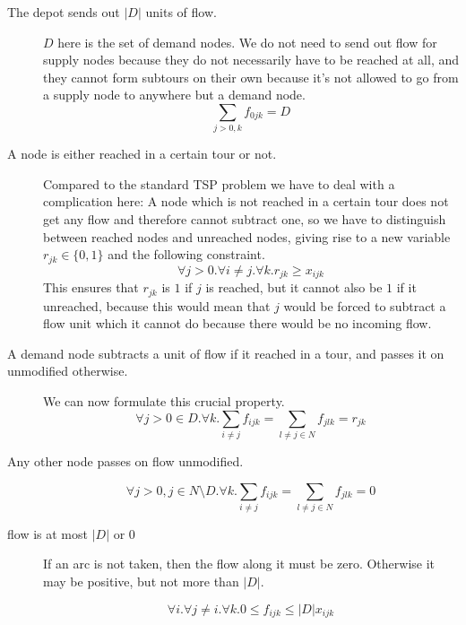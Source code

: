 \begin{description}
  \item[The depot sends out $|D|$ units of flow.] $D$ here is the set of demand nodes. We do 
  not need to send out flow for supply nodes because they do not necessarily have to be
  reached at all, and they cannot form subtours on their own because it's not allowed to 
  go from a supply node to anywhere but a demand node.
     \begin{equation}
       \sum_{j>0,k} f_{0jk} = D
     \end{equation}

  \item[A node is either reached in a certain tour or not.]
     Compared to the standard TSP problem we have to deal with a complication here: A node which 
     is not reached in a certain tour does not get any flow and therefore cannot subtract one,
     so we have to distinguish between reached nodes and unreached nodes, giving rise to a new
     variable $r_{jk} \in \{0,1\}$ and the following constraint.
     \begin{equation}
        \forall j>0. \forall i \neq j. \forall k. r_{jk} \geq x_{ijk}
     \end{equation}
     This ensures that $r_{jk}$ is $1$ if $j$ is reached, but it cannot also be $1$ if it unreached,
     because this would mean that $j$ would be forced to subtract a flow unit which it cannot
     do because there would be no incoming flow.

  \item[A demand node subtracts a unit of flow if it reached in a tour, and passes it on unmodified
        otherwise.] We can now formulate this crucial property.
  \begin{equation}
        \forall j>0 \in D. \forall k. \sum_{i \neq j} f_{ijk} = \sum_{l \neq j \in N} f_{jlk} = r_{jk}
  \end{equation}

  \item[Any other node passes on flow unmodified.]
  \begin{equation}
        \forall j>0, j \in N \setminus D. \forall k. \sum_{i \neq j} f_{ijk} = \sum_{l \neq j \in N} f_{jlk} = 0
  \end{equation}

  \item[flow is at most $|D|$ or $0$] 

  If an arc is not taken, then the flow along it must be zero. Otherwise it may be positive, but 
  not more than $|D|$.

  \begin{equation}
        \forall i. \forall j \neq i. \forall k. 0 \leq f_{ijk} \leq |D| x_{ijk}
  \end{equation}
\end{description}

